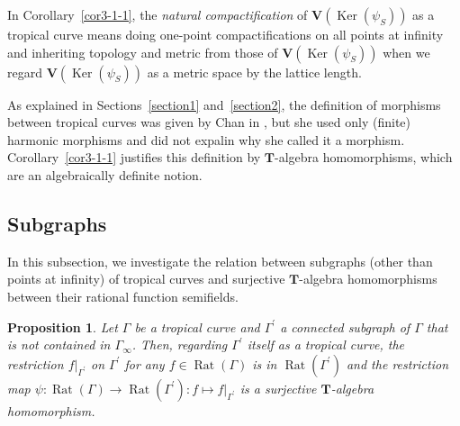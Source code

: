 \documentclass[a4paper,12pt]{amsart}
\newtheorem{prop}[dfn]{Proposition}
\def\Gamma{\varGamma}
\begin{document}
In Corollary~\ref{cor3-1-1}, the \textit{natural compactification} of $\boldsymbol{V}(\operatorname{Ker}(\psi_S))$ as a tropical curve means doing one-point compactifications on all points at infinity and inheriting topology and metric from those of $\boldsymbol{V}(\operatorname{Ker}(\psi_S))$ when we regard $\boldsymbol{V}(\operatorname{Ker}(\psi_S))$ as a metric space by the lattice length.

As explained in Sections~\ref{section1} and~\ref{section2}, the definition of morphisms between tropical curves was given by Chan in \cite{Chan}, but she used only (finite) harmonic morphisms and did not expalin why she called it a morphism.
Corollary~\ref{cor3-1-1} justifies this definition by $\boldsymbol{T}$-algebra homomorphisms, which are an algebraically definite notion.

\subsection{Subgraphs}
    \label{subsection3.2}

In this subsection, we investigate the relation between subgraphs (other than points at infinity) of tropical curves and surjective $\boldsymbol{T}$-algebra homomorphisms between their rational function semifields.

\begin{prop}
    \label{prop3-2-1}
Let $\Gamma$ be a tropical curve and $\Gamma^{\prime}$ a connected subgraph of $\Gamma$ that is not contained in $\Gamma_{\infty}$.
Then, regarding $\Gamma^{\prime}$ itself as a tropical curve, the restriction $f|_{\Gamma^{\prime}}$ on $\Gamma^{\prime}$ for any $f \in \operatorname{Rat}(\Gamma)$ is in $\operatorname{Rat}(\Gamma^{\prime})$ and the restriction map $\psi : \operatorname{Rat}(\Gamma) \to \operatorname{Rat}(\Gamma^{\prime}) : f \mapsto f|_{\Gamma^{\prime}}$ is a surjective $\boldsymbol{T}$-algebra homomorphism.
\end{prop}
\end{document}

